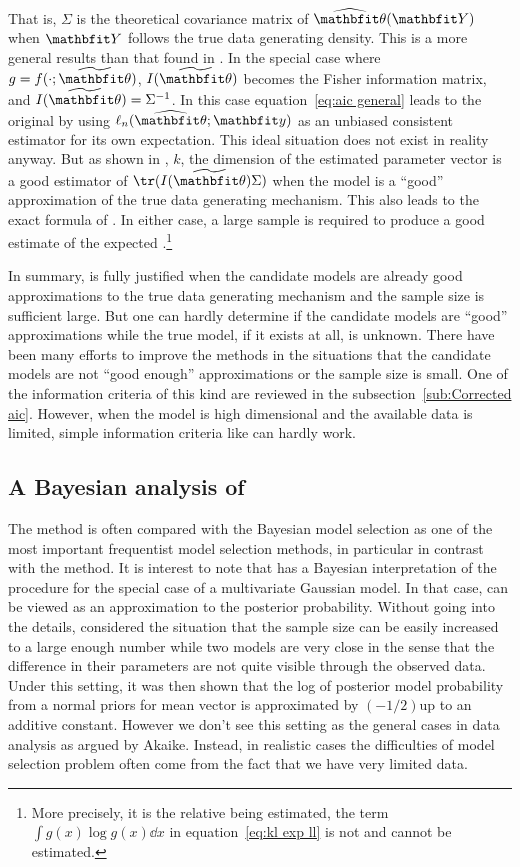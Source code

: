 That is, $\Sigma$ is the theoretical covariance matrix of $\hbth(\bfY)$ when
$\bfY$ follows the true data generating density. This is a more general
results than that found in \textcite{Akaike1973}. In the special case where $g
= f(\cdot;\tbth)$, $I(\tbth)$ becomes the Fisher information matrix, and
$I(\tbth) = \Sigma^{-1}$. In this case equation~\eqref{eq:aic general} leads
to the original \aic by using $\ell_n(\hbth;\bfy)$ as an unbiased consistent
estimator for its own expectation. This ideal situation does not exist in
reality anyway. But as shown in \textcite{Shibata1989}, $k$, the dimension of
the estimated parameter vector is a good estimator of $\tr(I(\tbth)\Sigma)$
when the model is a ``good'' approximation of the true data generating
mechanism. This also leads to the exact formula of \aic. In either case, a
large sample is required to produce a good estimate of the expected
\kl.\footnote{More precisely, it is the relative \kl being estimated, the term
  $\int g(x)\log g(x)\dd x$ in equation~\eqref{eq:kl exp ll} is not and cannot
  be estimated.}

In summary, \aic is fully justified when the candidate models are already good
approximations to the true data generating mechanism and the sample size is
sufficient large. But one can hardly determine if the candidate models are
``good'' approximations while the true model, if it exists at all, is unknown.
There have been many efforts to improve the \aic methods in the situations
that the candidate models are not ``good enough'' approximations or the sample
size is small. One of the information criteria of this kind are reviewed in
the subsection~\ref{sub:Corrected aic}. However, when the model is high
dimensional and the available data is limited, simple information criteria
like \aic can hardly work.
\endfirstyear

\subsection{A Bayesian analysis of \protect\aic}
\label{sub:A Bayesian analysis of aic}

The \aic method is often compared with the Bayesian model selection as one of
the most important frequentist model selection methods, in particular in
contrast with the \bic method. It is interest to note that
\textcite{Akaike1978} has a Bayesian interpretation of the \aic procedure for
the special case of a multivariate Gaussian model. In that case, \aic can be
viewed as an approximation to the posterior probability. Without going into
the details, \textcite{Akaike1978} considered the situation that the sample
size can be easily increased to a large enough number while two models are
very close in the sense that the difference in their parameters are not quite
visible through the observed data. Under this setting, it was then shown that
the log of posterior model probability from a normal priors for mean vector is
approximated by $(-1/2)$\aic up to an additive constant. However we don't see
this setting as the general cases in data analysis as argued by Akaike.
Instead, in realistic cases the difficulties of model selection problem often
come from the fact that we have very limited data.

